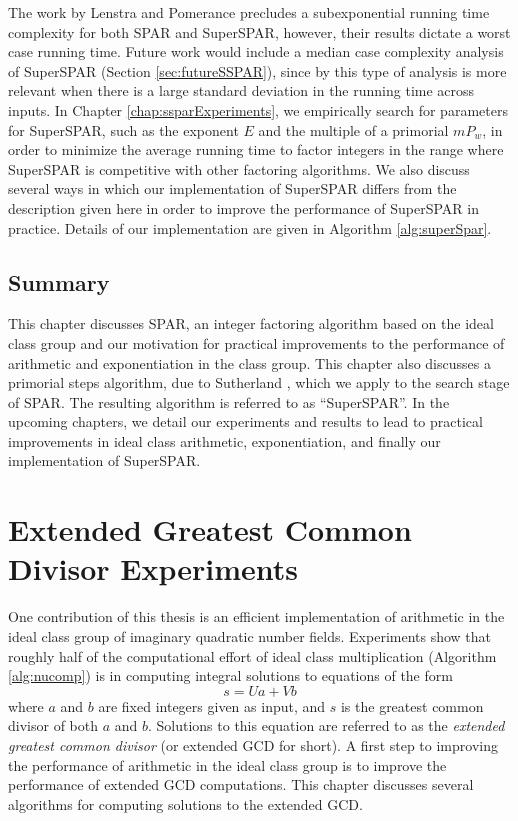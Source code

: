 \documentclass{ucalgthes1}
\theoremstyle{definition}
\begin{document}
The work by Lenstra and Pomerance \cite[\S 11]{Lenstra1992} precludes a subexponential running time complexity for both SPAR and SuperSPAR, however, their results dictate a worst case running time.  Future work would include a median case complexity analysis of SuperSPAR (Section \ref{sec:futureSSPAR}), since by \cite[p.15]{Sutherland2007} this type of analysis is more relevant when there is a large standard deviation in the running time across inputs.  In Chapter \ref{chap:ssparExperiments}, we empirically search for parameters for SuperSPAR, such as the exponent $E$ and the multiple of a primorial $mP_w$, in order to minimize the average running time to factor integers in the range where SuperSPAR is competitive with other factoring algorithms.  We also discuss several ways in which our implementation of SuperSPAR differs from the description given here in order to improve the performance of SuperSPAR in practice.  Details of our implementation are given in Algorithm \ref{alg:superSpar}.

\section{Summary}

This chapter discusses SPAR, an integer factoring algorithm based on the ideal class group and our motivation for practical improvements to the performance of arithmetic and exponentiation in the class group.  This chapter also discusses a primorial steps algorithm, due to Sutherland \cite{Sutherland2007}, which we apply to the search stage of SPAR.   The resulting algorithm is referred to as ``SuperSPAR''.   In the upcoming chapters, we detail our experiments and results to lead to practical improvements in ideal class arithmetic, exponentiation, and finally our implementation of SuperSPAR.


\chapter{Extended Greatest Common Divisor Experiments}
\label{chap:xgcdExperiments}

One contribution of this thesis is an efficient implementation of arithmetic in the ideal class group of imaginary quadratic number fields.  Experiments show that roughly half of the computational effort of ideal class multiplication (Algorithm \ref{alg:nucomp}) is in computing integral solutions to equations of the form
\[
	s = Ua + Vb
\]
where $a$ and $b$ are fixed integers given as input, and $s$ is the greatest common divisor of both $a$ and $b$.  Solutions to this equation are referred to as the \emph{extended greatest common divisor} (or extended GCD for short).  A first step to improving the performance of arithmetic in the ideal class group is to improve the performance of extended GCD computations.  This chapter discusses several algorithms for computing solutions to the extended GCD.
\end{document}
